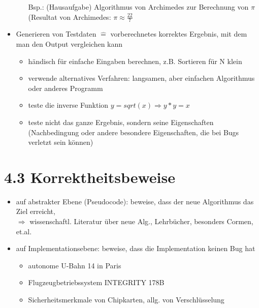 \documentclass[11pt, fleqn]{scrreprt}
\begin{document}
\begin{itemize}
\begin{itemize}
            Bsp.: (Hausaufgabe) Algorithmus von Archimedes zur Berechnung von $\pi$\\ \hspace*{0,9cm}(Resultat von Archimedes: $\pi \approx \frac{22}{7}$
        \end{itemize}
        \item Generieren von Testdaten $\widehat{=}$ vorberechnetes korrektes Ergebnis, mit dem man den Output vergleichen kann
        \begin{itemize}
            \item händisch für einfache Eingaben berechnen, z.B. Sortieren für N klein
            \item verwende alternatives Verfahren: langsamen, aber einfachen Algorithmus oder anderes Programm
            \item teste die inverse Funktion $y = sqrt(x) \Rightarrow y*y = x$
            \item teste nicht das ganze Ergebnis, sondern seine Eigenschaften (Nachbedingung oder andere besondere Eigenschaften, die bei Bugs verletzt sein können)
        \end{itemize}
    \end{itemize}

    \section*{4.3 Korrektheitsbeweise}
    \begin{itemize}
        \item auf abstrakter Ebene (Pseudocode): beweise, dass der neue Algorithmus das Ziel erreicht, \\
        $\Rightarrow$ wissenschaftl. Literatur über neue Alg., Lehrbücher, besonders Cormen, et.al.
        \item auf Implementationsebene: beweise, dass die Implementation keinen Bug hat
        \begin{itemize}
            \item autonome U-Bahn 14 in Paris
            \item Flugzeugbetriebssystem INTEGRITY 178B
            \item Sicherheitsmerkmale von Chipkarten, allg. von Verschlüsselung
        \end{itemize}
    \end{itemize}
\end{document}
